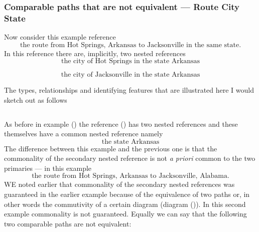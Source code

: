 \subsubsection {Comparable paths that are not equivalent --- Route City State}
\mynote {}
Now consider this example reference
\begin{equation}
\mbox{the route from Hot Springs, Arkansas to Jacksonville in the same state.}
\end{equation}
In this reference there are, implicitly, two nested references
\begin{equation}
\mbox{the city of Hot Springs in the state  Arkansas}
\end{equation}

\begin{equation}
\mbox{the city of Jacksonville in the state  Arkansas}
\end{equation}

The types, relationships and identifying features that are illustrated here
I would sketch out as follows

\begin{equation*}

\end{equation*}
\begin{equation*}

\end{equation*}


\mynote 
As before in example () the reference () has two nested references and these themselves have a common nested reference namely
\begin{equation*}
\mbox{the state Arkansas}
\end{equation*}
The difference between this example and the previous one is that the commonality of the secondary nested reference is not  \textit{a priori}
 common to the two primaries --- in this example
 \begin{equation*}
 \mbox{the route from Hot Springs, Arkansas to Jacksonville, Alabama.}
\end{equation*}
\mynote
WE noted earlier that commonality of the secondary nested references was guaranteed in the earlier example because of the equivalence of two paths or, in other words the commutivity of a certain diagram (diagram ()).
In this second example commonality is not guaranteed. Equally we can say that the following two comparable paths are not equivalent:


